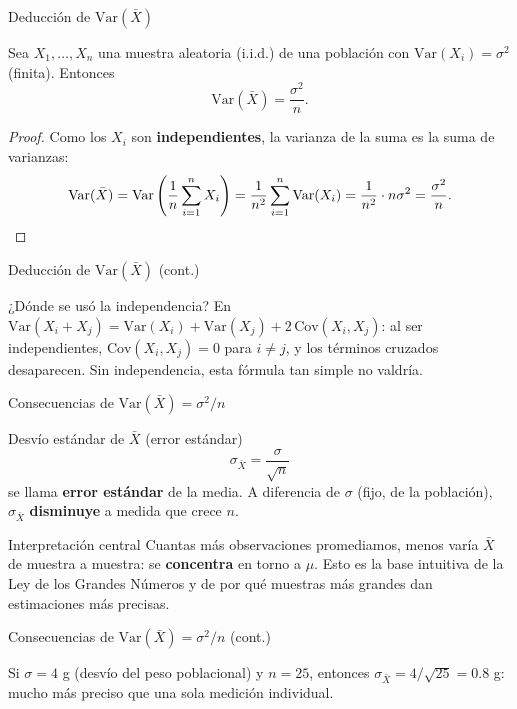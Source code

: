 \documentclass[aspectratio=169,11pt]{beamer}
\begin{document}
\begin{frame}{Deducción de $\text{Var}(\bar X)$}
\begin{theorem}
Sea $X_1,\dots,X_n$ una muestra aleatoria (i.i.d.) de una población con $\text{Var}(X_i)=\sigma^2$ (finita). Entonces
$$\text{Var}(\bar X) = \frac{\sigma^2}{n}.$$
\end{theorem}

\begin{proof}
Como los $X_i$ son \textbf{independientes}, la varianza de la suma es la suma de varianzas:
$$\text{Var}(\bar X) = \text{Var}\left(\frac{1}{n}\sum_{i=1}^n X_i\right) = \frac{1}{n^2}\sum_{i=1}^n \text{Var}(X_i) = \frac{1}{n^2}\cdot n\sigma^2 = \frac{\sigma^2}{n}. \qedhere$$
\end{proof}

\end{frame}

\begin{frame}{Deducción de $\text{Var}(\bar X)$ (cont.)}
\begin{alertblock}{¿Dónde se usó la independencia?}
En $\text{Var}(X_i+X_j) = \text{Var}(X_i)+\text{Var}(X_j)+2\,\text{Cov}(X_i,X_j)$: al ser independientes, $\text{Cov}(X_i,X_j)=0$ para $i\ne j$, y los términos cruzados desaparecen. Sin independencia, esta fórmula tan simple no valdría.
\end{alertblock}
\end{frame}

\begin{frame}{Consecuencias de $\text{Var}(\bar X)=\sigma^2/n$}
\begin{block}{Desvío estándar de $\bar X$ (error estándar)}
$$\sigma_{\bar X} = \frac{\sigma}{\sqrt n}$$
se llama \textbf{error estándar} de la media. A diferencia de $\sigma$ (fijo, de la población), $\sigma_{\bar X}$ \textbf{disminuye} a medida que crece $n$.
\end{block}

\begin{alertblock}{Interpretación central}
Cuantas más observaciones promediamos, menos varía $\bar X$ de muestra a muestra: se \textbf{concentra} en torno a $\mu$. Esto es la base intuitiva de la Ley de los Grandes Números y de por qué muestras más grandes dan estimaciones más precisas.
\end{alertblock}

\end{frame}

\begin{frame}{Consecuencias de $\text{Var}(\bar X)=\sigma^2/n$ (cont.)}
\begin{example}
Si $\sigma = 4$ g (desvío del peso poblacional) y $n=25$, entonces $\sigma_{\bar X} = 4/\sqrt{25} = 0.8$ g: mucho más preciso que una sola medición individual.
\end{example}
\end{frame}
\end{document}
